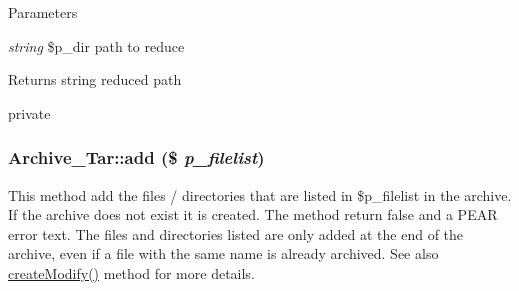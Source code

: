 \begin{DoxyParams}{Parameters}
\item[{\em string}]\$p\_\-dir path to reduce\end{DoxyParams}
\begin{DoxyReturn}{Returns}
string reduced path
\end{DoxyReturn}
private \hypertarget{classArchive__Tar_a507e2889d298e62403d0aac1e149c7a4}{
\subsubsection[{add}]{\setlength{\rightskip}{0pt plus 5cm}Archive\_\-Tar::add (\$ {\em p\_\-filelist})}}
\label{classArchive__Tar_a507e2889d298e62403d0aac1e149c7a4}
This method add the files / directories that are listed in \$p\_\-filelist in the archive. If the archive does not exist it is created. The method return false and a PEAR error text. The files and directories listed are only added at the end of the archive, even if a file with the same name is already archived. See also \hyperlink{classArchive__Tar_accecf70468a22e87d19a927f6802b8f2}{createModify()} method for more details.


